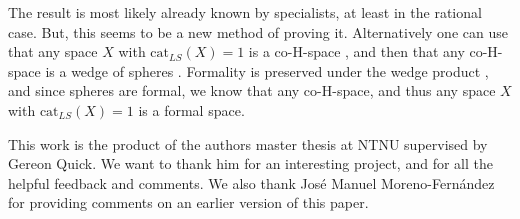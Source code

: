 The result is most likely already known by specialists, at least in the rational case.
But, this seems to be a new method of proving it. Alternatively one can use that any 
space $X$ with $\text{cat}_{LS}(X)=1$ is a co-H-space \cite{hess}, and then that any 
co-H-space is a wedge of spheres \cite{co-H-space}. Formality is preserved under the 
wedge product \cite{hess}, and since spheres are formal, we know that any co-H-space, 
and thus any space $X$ with $\text{cat}_{LS}(X)=1$ is a formal space. 

\begin{acknowledgements}
This work is the product of the authors master thesis at NTNU
supervised by Gereon Quick. We want to thank him for an interesting project, and for 
all the helpful feedback and comments. We also thank José Manuel Moreno-Fernández for 
providing comments on an earlier version of this paper. 
\end{acknowledgements}
